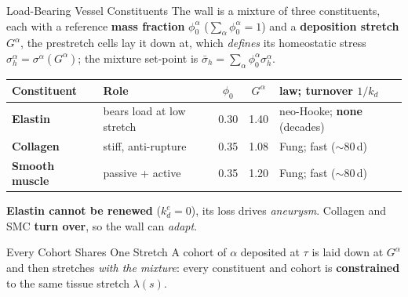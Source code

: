 \begin{frame}[t]{Load-Bearing Vessel Constituents}
  \footnotesize
  The wall is a mixture of three constituents, each with a reference \textbf{mass
  fraction} $\phi_0^{\alpha}$ ($\sum_\alpha\phi_0^{\alpha}=1$) and a
  \textbf{deposition stretch} $G^{\alpha}$, the prestretch cells lay it down at,
  which \emph{defines} its homeostatic stress
  $\sigma_h^{\alpha}=\sigma^{\alpha}(G^{\alpha})$; the mixture set-point is
  $\bar\sigma_h=\sum_\alpha\phi_0^{\alpha}\sigma_h^{\alpha}$.
  \vspace{0.3em}
  \renewcommand{\arraystretch}{1.3}
  \begin{center}
  \begin{tabular}{@{}p{}p{}ccp{}@{}}
    \toprule
    \textbf{Constituent} & \textbf{Role} & $\phi_0$ & $G^{\alpha}$ & \textbf{law; turnover $1/k_d$}\\
    \midrule
    \textbf{\color{YaleBlue}Elastin} & bears load at low stretch & 0.30 & 1.40 &
      neo-Hooke; \textbf{none} (decades)\\
    \textbf{\color{YaleBlue}Collagen} & stiff, anti-rupture & 0.35 & 1.08 &
      Fung; fast ($\sim$80\,d)\\
    \textbf{\color{YaleBlue}Smooth muscle} & passive + active & 0.35 & 1.20 &
      Fung; fast ($\sim$80\,d)\\
    \bottomrule
  \end{tabular}
  \end{center}
  \vspace{0.3em}
  \textbf{Elastin cannot be renewed} ($k_d^e=0$), its loss drives
  \emph{aneurysm}. Collagen and SMC \textbf{turn over}, so the wall can
  \emph{adapt}.
\end{frame}

\begin{frame}[t]{Every Cohort Shares One Stretch}
  A cohort of $\alpha$ deposited at $\tau$ is laid down at $G^{\alpha}$ and then
  stretches \emph{with the mixture}: every constituent and cohort is
  \textbf{constrained} to the same tissue stretch $\lambda(s)$.
\end{frame}

